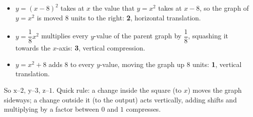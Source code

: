 \begin{itemize}
\item[x.] $y=(x-8)^2$ takes at $x$ the value that $y=x^2$ takes at $x-8$, so the graph of $y=x^2$ is moved $8$ units to the right: \textbf{2}, horizontal translation.
\item[y.] $y=\dfrac{1}{8}x^2$ multiplies every $y$-value of the parent graph by $\dfrac{1}{8}$, squashing it towards the $x$-axis: \textbf{3}, vertical compression.
\item[z.] $y=x^2+8$ adds $8$ to every $y$-value, moving the graph up $8$ units: \textbf{1}, vertical translation.
\end{itemize}
So $\boxed{\text{x--2, y--3, z--1}}$. Quick rule: a change inside the square (to $x$) moves the graph sideways; a change outside it (to the output) acts vertically, adding shifts and multiplying by a factor between $0$ and $1$ compresses.
